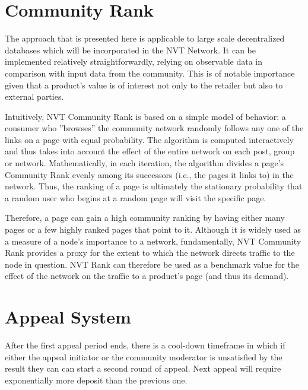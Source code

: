
\section{Community Rank}

The approach that is presented here is applicable to large scale decentralized databases which will be incorporated in the NVT Network. It can be implemented relatively straightforwardly, relying on observable data in comparison with input data from the community. This is of notable importance given that a product’s value is of interest not only to the retailer but also to external parties.

Intuitively, NVT Community Rank is based on a simple model of behavior: a consumer who ”browses” the community network randomly follows any one of the links on a page with equal probability. The algorithm is computed interactively and thus takes into account the effect of the entire network on each post, group or network. Mathematically, in each iteration, the algorithm divides a page’s Community Rank evenly among its successors (i.e., the pages it links to) in the network. Thus, the ranking of a page is ultimately the stationary probability that a random user who begins at a random page will visit the specific page.

Therefore, a page can gain a high community ranking by having either many pages or a few highly ranked pages that point to it. Although it is widely used as a measure of a node’s importance to a network, fundamentally, NVT Community Rank provides a proxy for the extent to which the network directs traffic to the node in question. NVT Rank can therefore be used as a benchmark value for the effect of the network on the traffic to a product’s page (and thus its demand).


\section{Appeal System}

After the first appeal period ends, there is a cool-down timeframe in which if either the appeal initiator or the community moderator is unsatisfied by the result they can can start a second round of appeal. Next appeal will require exponentially more deposit than the previous one.

